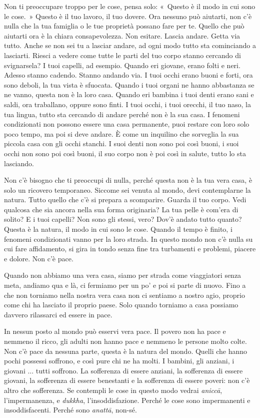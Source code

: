 Non ti preoccupare troppo per le cose, pensa solo: «~Questo è il modo in
cui sono le cose.~» Questo è il tuo lavoro, il tuo dovere. Ora nessuno
può aiutarti, non c'è nulla che la tua famiglia o le tue proprietà
possano fare per te. Quello che può aiutarti ora è la chiara
consapevolezza. Non esitare. Lascia andare. Getta via tutto. Anche se
non sei tu a lasciar andare, ad ogni modo tutto sta cominciando a
lasciarti. Riesci a vedere come tutte le parti del tuo corpo stanno
cercando di svignarsela? I tuoi capelli, ad esempio. Quando eri giovane,
erano folti e neri. Adesso stanno cadendo. Stanno andando via. I tuoi
occhi erano buoni e forti, ora sono deboli, la tua vista è sfuocata.
Quando i tuoi organi ne hanno abbastanza se ne vanno, questa non è la
loro casa. Quando eri bambina i tuoi denti erano sani e saldi, ora
traballano, oppure sono finti. I tuoi occhi, i tuoi orecchi, il tuo
naso, la tua lingua, tutto sta cercando di andare perché non è la sua
casa. I fenomeni condizionati non possono essere una casa permanente,
puoi restare con loro solo poco tempo, ma poi si deve andare. È come un
inquilino che sorveglia la sua piccola casa con gli occhi stanchi. I
suoi denti non sono poi così buoni, i suoi occhi non sono poi così
buoni, il suo corpo non è poi così in salute, tutto lo sta lasciando.

Non c'è bisogno che ti preoccupi di nulla, perché questa non è la tua
vera casa, è solo un ricovero temporaneo. Siccome sei venuta al mondo,
devi contemplarne la natura. Tutto quello che c'è si prepara a
scomparire. Guarda il tuo corpo. Vedi qualcosa che sia ancora nella sua
forma originaria? La tua pelle è com'era di solito? E i tuoi capelli?
Non sono gli stessi, vero? Dov'è andato tutto quanto? Questa è la
natura, il modo in cui sono le cose. Quando il tempo è finito, i
fenomeni condizionati vanno per la loro strada. In questo mondo non c'è
nulla su cui fare affidamento, si gira in tondo senza fine tra
turbamenti e problemi, piacere e dolore. Non c'è pace.

Quando non abbiamo una vera casa, siamo per strada come viaggiatori
senza meta, andiamo qua e là, ci fermiamo per un po' e poi si parte di
nuovo. Fino a che non torniamo nella nostra vera casa non ci sentiamo a
nostro agio, proprio come chi ha lasciato il proprio paese. Solo quando
torniamo a casa possiamo davvero rilassarci ed essere in pace.

In nessun posto al mondo può esservi vera pace. Il povero non ha pace e
nemmeno il ricco, gli adulti non hanno pace e nemmeno le persone molto
colte. Non c'è pace da nessuna parte, questa è la natura del mondo.
Quelli che hanno pochi possessi soffrono, e così pure chi ne ha molti. I
bambini, gli anziani, i giovani ... tutti soffrono. La sofferenza di
essere anziani, la sofferenza di essere giovani, la sofferenza di essere
benestanti e la sofferenza di essere poveri: non c'è altro che
sofferenza. Se contempli le cose in questo modo vedrai \emph{aniccā},
l'impermanenza, e \emph{dukkha}, l'insoddisfazione. Perché le cose sono
impermanenti e insoddisfacenti. Perché sono \emph{anattā}, non-sé.

